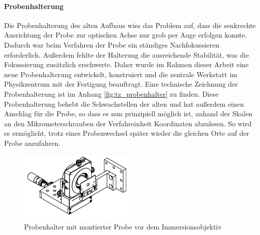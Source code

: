 \documentclass[titlepage,  ngerman]{article}
\begin{document}
	\paragraph{Probenhalterung}
	Die Probenhalterung des alten Aufbaus wies das Problem auf, dass die senkrechte Ausrichtung der Probe zur optischen Achse nur grob per Auge erfolgen konnte. Dadurch war beim Verfahren der Probe ein ständiges Nachfokussieren erforderlich. Außerdem fehlte der Halterung die ausreichende Stabilität, was die Fokussierung zusätzlich erschwerte. Daher wurde im Rahmen dieser Arbeit eine neue Probenhalterung entwickelt, konstruiert und die zentrale Werkstatt im Physikzentrum mit der Fertigung beauftragt. Eine technische Zeichnung der Probenhalterung ist im Anhang \ref{fig:tz_probenhalter} zu finden. Diese Probenhalterung behebt die Schwachstellen der alten und hat außerdem einen Anschlag für die Probe, so dass es nun prinzipiell möglich ist, anhand der Skalen an den Mikrometerschrauben der Verfahreinheit Koordinaten abzulesen. So wird es ermöglicht, trotz eines Probenwechsel später wieder die gleichen Orte auf der Probe anzufahren.
	\begin{figure}[h] 
		\centering
		\includegraphics[width=0.5\textwidth]{figures/Probenhalter.pdf}
		\caption[Probenhalterung]{Probenhalter mit montierter Probe vor dem Immersionsobjektiv}
		\label{fig:probenhalter}
	\end{figure}
\end{document}
